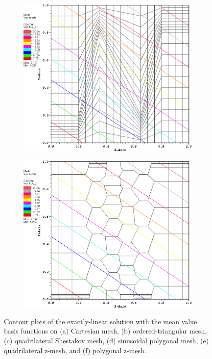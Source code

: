\begin{figure}
\begin{subfigure}[b]{0.45\textwidth}
		\caption{}
	\end{subfigure}
	\vfill
	\begin{subfigure}[b]{0.45\textwidth}
		\centering
		\label{subfig::z_quad_mv_lin_sol}
		\includegraphics[width=\textwidth]{figures/sec_BF/z_quad_MV_k1.eps}
		\caption{}
	\end{subfigure}
	\hfill
	\begin{subfigure}[b]{0.45\textwidth}
		\centering
		\label{subfig::z_poly_mv_lin_sol}
		\includegraphics[width=\textwidth]{figures/sec_BF/z_poly_MV_k1.eps}
		\caption{}
	\end{subfigure}
\caption{Contour plots of the exactly-linear solution with the mean value basis functions on (a) Cartesian mesh, (b) ordered-triangular mesh, (c) quadrilateral Shestakov mesh, (d) sinusoidal polygonal mesh, (e) quadrilateral z-mesh, and (f) polygonal z-mesh.}
\label{fig::BF_Results_Linear_mv_sol}
\end{figure}

